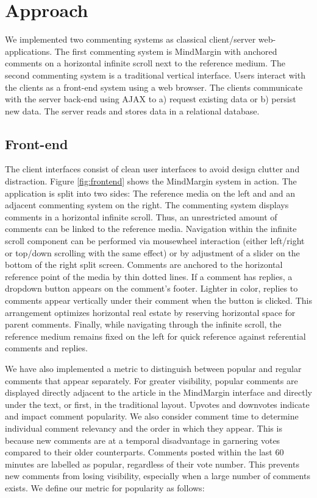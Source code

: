 \section {Approach}

We implemented two commenting systems as classical client/server web-applications. The first commenting system is MindMargin with anchored comments on a horizontal infinite scroll next to the reference medium. The second commenting system is a traditional vertical interface. Users interact with the clients as a front-end system using a web browser. The clients communicate with the server back-end using AJAX to a) request existing data or b) persist new data. The server reads and stores data in a relational database.

\subsection{Front-end}
The client interfaces consist of clean user interfaces to avoid design clutter and distraction. Figure \ref{fig:frontend} shows the MindMargin system in action. The application is split into two sides: The reference media on the left and and an adjacent commenting system on the right. The commenting system displays comments in a horizontal infinite scroll. Thus, an unrestricted amount of comments can be linked to the reference media. Navigation within the infinite scroll component can be performed via mousewheel interaction (either left/right or top/down scrolling with the same effect) or by adjustment of a slider on the bottom of the right split screen. Comments are anchored to the horizontal reference point of the media by thin dotted lines. If a comment has replies, a dropdown button appears on the comment's footer. Lighter in color, replies to comments appear vertically under their comment when the button is clicked. This arrangement optimizes horizontal real estate by reserving horizontal space for parent comments. Finally, while navigating through the infinite scroll, the reference medium remains fixed on the left for quick reference against referential comments and replies.

We have also implemented a metric to distinguish between popular and regular comments that appear separately. For greater visibility, popular comments are displayed directly adjacent to the article in the MindMargin interface and directly under the text, or first, in the traditional layout. Upvotes and downvotes indicate and impact comment popularity. We also consider comment time to determine individual comment relevancy and the order in which they appear. This is because new comments are at a temporal disadvantage in garnering votes compared to their older counterparts. Comments posted within the last 60 minutes are labelled as popular, regardless of their vote number. This prevents new comments from losing visibility, especially when a large number of comments exists. We define our metric for popularity as follows:

